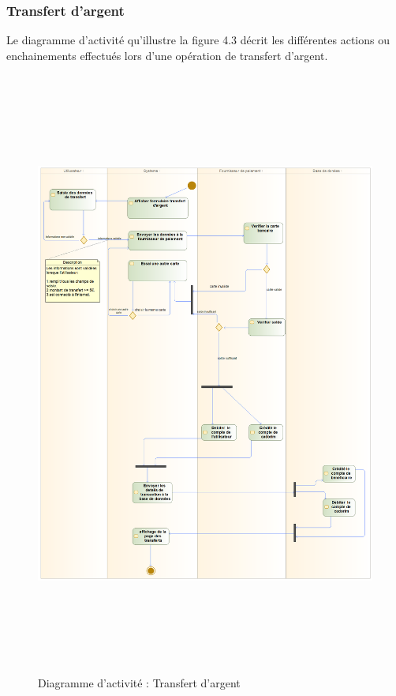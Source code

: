 \subsubsection{Transfert d'argent}
Le diagramme d’activité qu’illustre la figure 4.3 décrit les différentes actions ou enchainements
effectués lors d’une opération de transfert d’argent.
\begin{figure}[h!]
	\includegraphics[width=18cm, height=20cm]{./Template LaTeX/Images/trans_act.png}
	\caption{Diagramme d'activité : Transfert d'argent}
	\label{fig3:activite}
\end{figure}
\newpage
